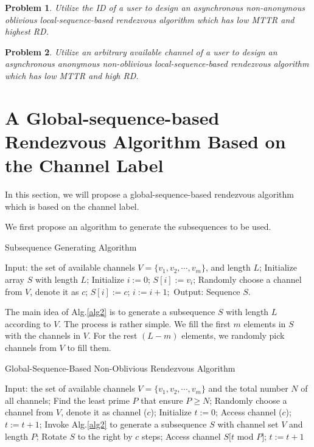 \documentclass[10pt, conference, letterpaper]{IEEEtran}
\newtheorem{problem}{Problem}
\begin{document}
\begin{problem}
Utilize the ID of a user to design an asynchronous non-anonymous oblivious local-sequence-based rendezvous algorithm which has low MTTR and highest RD.
\end{problem}

\begin{problem}
Utilize an arbitrary available channel of a user to design an asynchronous anonymous non-oblivious local-sequence-based rendezvous algorithm which has low MTTR and high RD.
\end{problem}

\section{A Global-sequence-based Rendezvous Algorithm Based on the Channel Label}

In this section, we will propose a global-sequence-based rendezvous algorithm which is based on the channel label.

We first propose an algorithm to generate the subsequences to be used.

\begin{algorithm}
\caption{Subsequence Generating Algorithm}
\label{alg2}
\begin{algorithmic}[1]
\STATE Input: the set of available channels $V=\{v_1,v_2,\cdots,v_m\}$, and length $L$;
\STATE Initialize array $S$ with length $L$;
\STATE Initialize $i :=0$;
\STATE $S[i] := v_i$;
\ELSE
\STATE Randomly choose a channel from $V$, denote it as $c$;
\STATE $S[i] := c$;
\ENDIF
\STATE $i:=i+1;$
\ENDWHILE
\STATE Output: Sequence $S$.
\end{algorithmic}
\end{algorithm}

The main idea of Alg.\ref{alg2} is to generate a subsequence $S$ with length $L$ according to $V$. The process is rather simple. We fill the first $m$ elements in $S$ with the channels in $V$. For the rest $(L-m)$ elements, we randomly pick channels from $V$ to fill them.


\begin{algorithm}
\caption{Global-Sequence-Based Non-Oblivious Rendezvous Algorithm}
\label{alg1}
\begin{algorithmic}[1]
\STATE Input: the set of available channels $V=\{v_1, v_2, \cdots, v_m\}$ and the total number $N$ of all channels;
\STATE Find the least prime $P$ that ensure $P \ge N$;
\STATE Randomly choose a channel from $V$, denote it as channel ($c$);
\STATE Initialize $t := 0$;
\STATE Access channel ($c$);
\STATE $t:=t+1$;
\ENDWHILE
\STATE Invoke Alg.\ref{alg2} to generate a subsequence $S$ with channel set $V$ and length $P$;
\STATE Rotate $S$ to the right by $c$ steps;
\ENDIF
\STATE Access channel $S[t$ mod $P]$;
\STATE $t := t + 1$
\ENDWHILE

\end{algorithmic}
\end{algorithm}
\end{document}
